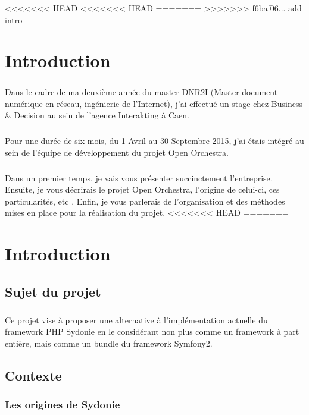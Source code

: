 <<<<<<< HEAD
<<<<<<< HEAD
=======
>>>>>>> f6baf06... add intro
\chapter*{Introduction}
        \paragraph{}
         Dans le cadre de ma deuxième année du master DNR2I (Master document numérique en réseau, ingénierie de l'Internet), j'ai effectué un stage chez Business \& Decision au sein de l'agence Interakting à Caen.
         \paragraph{}
          Pour une durée de six mois, du 1 Avril au 30 Septembre 2015, j'ai étais intégré au sein de l'équipe de développement du projet Open Orchestra.
         \paragraph{}
         Dans un premier temps, je vais vous présenter succinctement l'entreprise. Ensuite, je vous décrirais le projet Open Orchestra, l'origine de celui-ci, ces particularités, etc . Enfin, je vous parlerais de l'organisation et des méthodes mises en place pour la réalisation du projet.
<<<<<<< HEAD
=======
\chapter{Introduction}
    \section{Sujet du projet}
        \paragraph{}
        Ce projet vise à proposer une alternative à l'implémentation actuelle du framework PHP \og{}Sydonie\fg{} en le considérant non plus comme un framework à part entière, mais comme un bundle du framework Symfony2.

    \section{Contexte}
        \subsection{Les origines de Sydonie}
